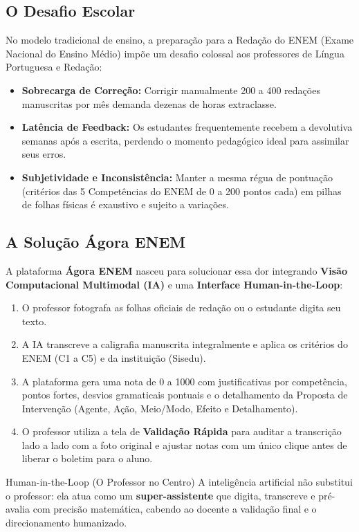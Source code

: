 \documentclass[11pt,a4paper]{article}
\begin{document}
\subsection{O Desafio Escolar}
No modelo tradicional de ensino, a preparação para a Redação do ENEM (Exame Nacional do Ensino Médio) impõe um desafio colossal aos professores de Língua Portuguesa e Redação:
\begin{itemize}[leftmargin=1.5em]
    \item \textbf{Sobrecarga de Correção:} Corrigir manualmente 200 a 400 redações manuscritas por mês demanda dezenas de horas extraclasse.
    \item \textbf{Latência de Feedback:} Os estudantes frequentemente recebem a devolutiva semanas após a escrita, perdendo o momento pedagógico ideal para assimilar seus erros.
    \item \textbf{Subjetividade e Inconsistência:} Manter a mesma régua de pontuação (critérios das 5 Competências do ENEM de 0 a 200 pontos cada) em pilhas de folhas físicas é exaustivo e sujeito a variações.
\end{itemize}

\subsection{A Solução Ágora ENEM}
A plataforma \textbf{Ágora ENEM} nasceu para solucionar essa dor integrando \textbf{Visão Computacional Multimodal (IA)} e uma \textbf{Interface Human-in-the-Loop}:
\begin{enumerate}[leftmargin=1.5em]
    \item O professor fotografa as folhas oficiais de redação ou o estudante digita seu texto.
    \item A IA transcreve a caligrafia manuscrita integralmente e aplica os critérios do ENEM (C1 a C5) e da instituição (Sisedu).
    \item A plataforma gera uma nota de 0 a 1000 com justificativas por competência, pontos fortes, desvios gramaticais pontuais e o detalhamento da Proposta de Intervenção (Agente, Ação, Meio/Modo, Efeito e Detalhamento).
    \item O professor utiliza a tela de \textbf{Validação Rápida} para auditar a transcrição lado a lado com a foto original e ajustar notas com um único clique antes de liberar o boletim para o aluno.
\end{enumerate}

\begin{successbox}{Human-in-the-Loop (O Professor no Centro)}
A inteligência artificial não substitui o professor: ela atua como um \textbf{super-assistente} que digita, transcreve e pré-avalia com precisão matemática, cabendo ao docente a validação final e o direcionamento humanizado.
\end{successbox}
\end{document}
